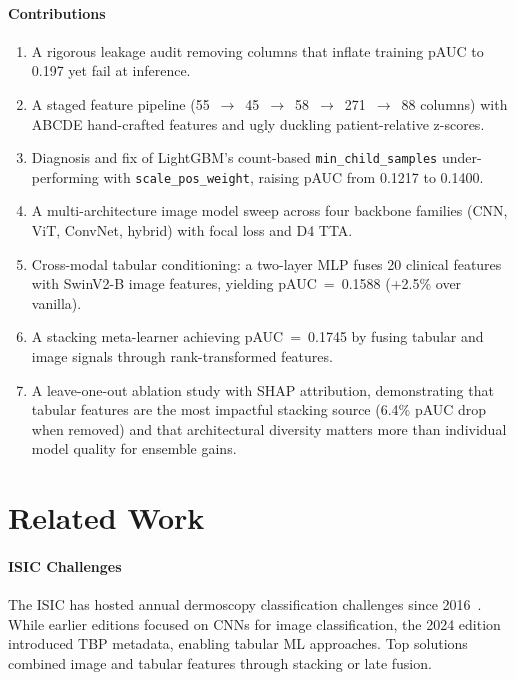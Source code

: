 \documentclass[conference]{IEEEtran}
\begin{document}
\paragraph*{Contributions}
\begin{enumerate}[noitemsep, leftmargin=*]
  \item A rigorous leakage audit removing columns that inflate training
        pAUC to 0.197 yet fail at inference.
  \item A staged feature pipeline
        (55~$\to$~45~$\to$~58~$\to$~271~$\to$~88 columns) with ABCDE
        hand-crafted features and ugly duckling patient-relative z-scores.
  \item Diagnosis and fix of LightGBM's count-based
        \texttt{min\_child\_samples} under-performing with
        \texttt{scale\_pos\_weight}, raising pAUC from 0.1217 to 0.1400.
  \item A multi-architecture image model sweep across four backbone
        families (CNN, ViT, ConvNet, hybrid) with focal loss and D4 TTA.
  \item Cross-modal tabular conditioning: a two-layer MLP fuses 20
        clinical features with SwinV2-B image features, yielding
        pAUC~=~0.1588 (+2.5\% over vanilla).
  \item A stacking meta-learner achieving pAUC~=~0.1745 by fusing
        tabular and image signals through rank-transformed features.
  \item A leave-one-out ablation study with SHAP attribution,
        demonstrating that tabular features are the most impactful
        stacking source (6.4\% pAUC drop when removed) and that
        architectural diversity matters more than individual model
        quality for ensemble gains.
\end{enumerate}

\section{Related Work}

\paragraph{ISIC Challenges}
The ISIC has hosted annual dermoscopy classification challenges since
2016~\cite{codella2018}. While earlier editions focused on CNNs for
image classification, the 2024 edition introduced TBP metadata,
enabling tabular ML approaches. Top solutions combined image and
tabular features through stacking or late fusion.
\end{document}
